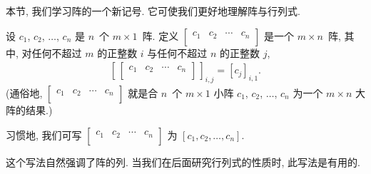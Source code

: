 \documentclass[../libro.tex]{subfiles}
\begin{document}
本节, 我们学习阵的一个新记号.
它可使我们更好地理解阵与行列式.

\begin{definition}
    设 \(c_1\), \(c_2\), \(\dots\), \(c_n\)
    是 \(n\)~个 \(m \times 1\)~阵.
    定义
    \(
        \begin{bmatrix}
            c_1 & c_2 & \cdots & c_n \\
        \end{bmatrix}
    \)
    是一个 \(m \times n\)~阵,
    其中, 对任何不超过 \(m\) 的正整数 \(i\)
    与任何不超过 \(n\) 的正整数 \(j\),
    \begin{align*}
        \left[\,
            \begin{bmatrix}
                c_1 & c_2 & \cdots & c_n \\
            \end{bmatrix}
        \,\right]_{i,j}
        = [c_j]_{i,1}.
    \end{align*}
    (通俗地, %
    \(
        \begin{bmatrix}
            c_1 & c_2 & \cdots & c_n \\
        \end{bmatrix}
    \)
    就是合 \(n\)~个 \(m \times 1\) 小阵
    \(c_1\), \(c_2\), \(\dots\), \(c_n\)
    为一个 \(m \times n\) 大阵的结果.) %

    习惯地, 我们可写
    \(
        \begin{bmatrix}
            c_1 & c_2 & \cdots & c_n \\
        \end{bmatrix}
    \)
    为 \([c_1, c_2, \dots, c_n]\).
\end{definition}

这个写法自然强调了阵的列.
当我们在后面研究行列式的性质时, 此写法是有用的.
\end{document}

